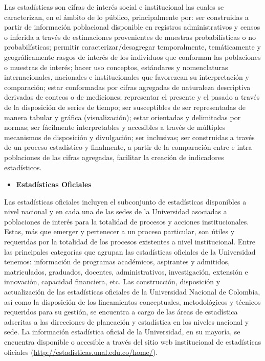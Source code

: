 \documentclass[
]{book}
\providecommand{\tightlist}{%
  \setlength{\itemsep}{0pt}\setlength{\parskip}{0pt}}
\begin{document}
Las estadísticas son cifras de interés social e institucional las cuales se caracterizan, en el ámbito de lo público, principalmente por: ser construidas a partir de información poblacional disponible en registros administrativos y censos o inferida a través de estimaciones provenientes de muestras probabilísticas o no probabilísticas; permitir caracterizar/desagregar temporalmente, temáticamente y geográficamente rasgos de interés de los individuos que conforman las poblaciones o muestras de interés; hacer uso conceptos, estándares y nomenclaturas internacionales, nacionales e institucionales que favorezcan su interpretación y comparación; estar conformadas por cifras agregadas de naturaleza descriptiva derivadas de conteos o de mediciones; representar el presente y el pasado a través de la disposición de series de tiempo; ser susceptibles de ser representadas de manera tabular y gráfica (visualización); estar orientadas y delimitadas por normas; ser fácilmente interpretables y accesibles a través de múltiples mecanismos de disposición y divulgación; ser inclusivas; ser construidas a través de un proceso estadístico y finalmente, a partir de la comparación entre e intra poblaciones de las cifras agregadas, facilitar la creación de indicadores estadísticos.

\begin{itemize}
\tightlist
\item
  \textbf{Estadísticas Oficiales}
\end{itemize}

Las estadísticas oficiales incluyen el subconjunto de estadísticas disponibles a nivel nacional y en cada una de las sedes de la Universidad asociadas a poblaciones de interés para la totalidad de procesos y acciones institucionales. Estas, más que emerger y pertenecer a un proceso particular, son útiles y requeridas por la totalidad de los procesos existentes a nivel institucional. Entre las principales categorías que agrupan las estadísticas oficiales de la Universidad tenemos: información de programas académicos, aspirantes y admitidos, matriculados, graduados, docentes, administrativos, investigación, extensión e innovación, capacidad financiera, etc. Las construcción, disposición y actualización de las estadísticas oficiales de la Universidad Nacional de Colombia, así como la disposición de los lineamientos conceptuales, metodológicos y técnicos requeridos para su gestión, se encuentra a cargo de las áreas de estadística adscritas a las direcciones de planeación y estadística en los niveles nacional y sede. La información estadística oficial de la Universidad, en su mayoría, se encuentra disponible o accesible a través del sitio web institucional de estadísticas oficiales (\url{http://estadisticas.unal.edu.co/home/}).
\end{document}
